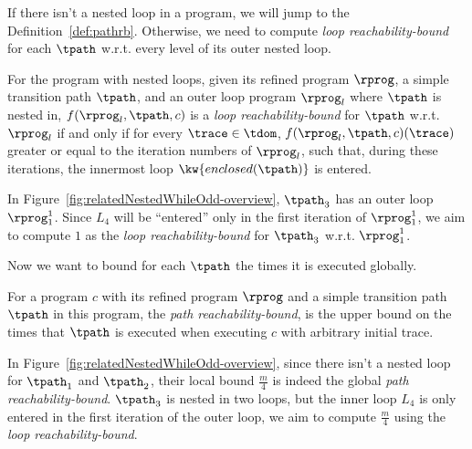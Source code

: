 If there isn't a nested loop in a program, we will jump to the Definition~\ref{def:pathrb}.
Otherwise, we need to compute \emph{loop reachability-bound}
for each $\tpath$ w.r.t. every level of its outer nested loop.
\begin{defn}
For the program with nested loops, given its refined program $\rprog$, a simple transition path $\tpath$, and an outer loop
program $\rprog_l$ where $\tpath$ is nested in,
$f(\rprog_l, \tpath, c)$ is a \emph{loop reachability-bound} for $\tpath$ w.r.t. $\rprog_l$ if and only if
for every $\trace \in \tdom$, $f(\rprog_l, \tpath, c)(\trace)$ greater or equal to the
iteration numbers of $\rprog_l$,
such that,
during these iterations, the innermost loop $\kw{enclosed(\tpath)}$ is entered.
\end{defn}
In Figure~\ref{fig:relatedNestedWhileOdd-overview}, $\tpath_3$ has an outer loop $\rprog_1^1$. Since $L_4$ will be ``entered'' only in the first iteration of $\rprog_1^1$,
we aim to compute $1$ as the \emph{loop reachability-bound} for $\tpath_3$ w.r.t. $\rprog_1^1$.

Now we want to bound for each $\tpath$ the times it is executed globally.
\begin{defn}
For a program $c$ with its refined program $\rprog$ and a simple transition path $\tpath$ in this program, 
the \emph{path reachability-bound},
is the upper bound on the
times that $\tpath$ is executed when executing $c$ with arbitrary initial trace.
\end{defn}
%
In Figure~\ref{fig:relatedNestedWhileOdd-overview}, since there isn't a nested loop for $\tpath_1$ and $\tpath_2$, their local bound $\frac{m}{4}$ is indeed the global \emph{path reachability-bound}.
$\tpath_3$ is nested in two loops, but the inner loop $L_4$ is only entered in the first iteration of the outer loop, we aim to compute $\frac{m}{4}$ using the \emph{loop reachability-bound}.


